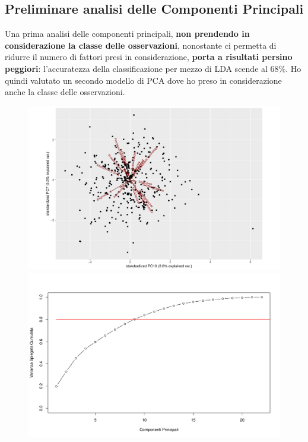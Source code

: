 \documentclass[11pt,a4paper]{article}
\begin{document}
\subsection{Preliminare analisi delle Componenti Principali}
Una prima analisi delle componenti principali, \textbf{non prendendo in
considerazione la classe delle osservazioni}, nonostante ci permetta di ridurre
il numero di fattori presi in considerazione, \textbf{porta a risultati persino
peggiori}: l'accuratezza della classificazione per mezzo di LDA scende al
$68\%$. Ho quindi valutato un secondo modello di PCA dove ho preso in
considerazione anche la classe delle osservazioni.
\begin{figure}[H]
	\hspace{-3.40cm}
	\begin{minipage}{0.73\textwidth}
		\includegraphics[scale=.45]{imgs/ggbiplot.pdf}
	\end{minipage}
	\begin{minipage}{0.5\textwidth}
		\includegraphics[scale=.38]{imgs/cumulative_variance.pdf}
	\end{minipage}
\end{figure}
\end{document}
